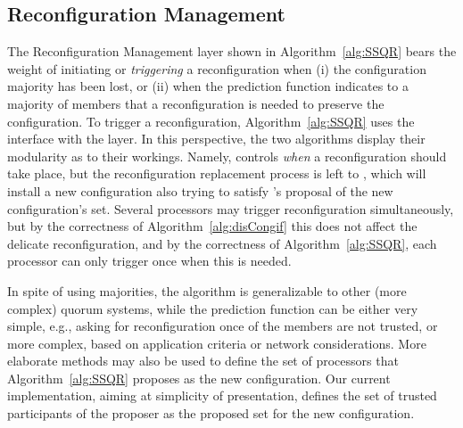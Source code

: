 \documentclass[11pt]{article}
\begin{document}
\subsection{Reconfiguration Management}
\label{sec:reconMan}
The Reconfiguration Management  layer shown in Algorithm~\ref{alg:SSQR} bears the weight of initiating or \emph{triggering} a reconfiguration when (i) the configuration majority has been lost, or (ii) when the prediction function  indicates to a majority of members that a reconfiguration is needed to preserve the configuration.
To trigger a reconfiguration, Algorithm~\ref{alg:SSQR} uses the  interface with the  layer.
In this perspective, the two algorithms display their modularity as to their workings.
Namely,  controls \emph{when} a reconfiguration should take place, but the reconfiguration replacement process is left to , which will install a new configuration also trying to satisfy 's proposal of the new configuration's set.
Several processors may trigger reconfiguration simultaneously, but by the correctness of Algorithm~\ref{alg:disCongif} this does not affect the delicate reconfiguration, and by the correctness of Algorithm~\ref{alg:SSQR}, each processor can only trigger once when this is needed.

In spite of using majorities, the algorithm is generalizable to other (more complex) quorum systems, while the prediction function  can be either very simple, e.g., asking for reconfiguration once  of the members are not trusted, or more complex, based on application criteria or network considerations.
More elaborate methods may also be used to define the set of processors that Algorithm~\ref{alg:SSQR} proposes as the new configuration. Our current implementation, aiming at simplicity of presentation, defines the set of trusted participants of the proposer as the proposed set for the new configuration.
\end{document}
